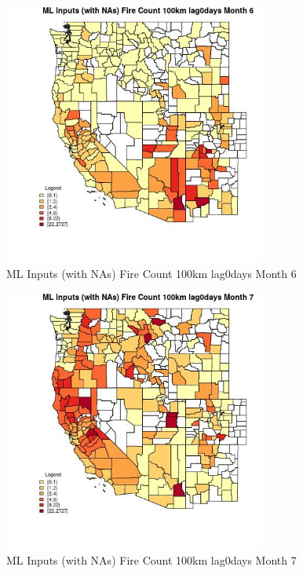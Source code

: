\begin{figure} 
\centering  
\includegraphics[width=0.77\textwidth]{Code_Outputs/Report_ML_input_PM25_Step4_part_f_de_duplicated_aveswNAs_CountyFire_Count_100km_lag0daysmedianMonth6.jpg} 
\caption{\label{fig:Report_ML_input_PM25_Step4_part_f_de_duplicated_aveswNAsCountyFire_Count_100km_lag0daysmedianMonth6}ML Inputs (with NAs) Fire Count 100km lag0days Month 6} 
\end{figure} 
 

\clearpage 

\begin{figure} 
\centering  
\includegraphics[width=0.77\textwidth]{Code_Outputs/Report_ML_input_PM25_Step4_part_f_de_duplicated_aveswNAs_CountyFire_Count_100km_lag0daysmedianMonth7.jpg} 
\caption{\label{fig:Report_ML_input_PM25_Step4_part_f_de_duplicated_aveswNAsCountyFire_Count_100km_lag0daysmedianMonth7}ML Inputs (with NAs) Fire Count 100km lag0days Month 7} 
\end{figure} 
 

